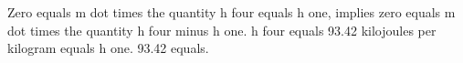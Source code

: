 Zero equals m dot times the quantity h four equals h one, implies zero equals m dot times the quantity h four minus h one. h four equals 93.42 kilojoules per kilogram equals h one. 93.42 equals.
